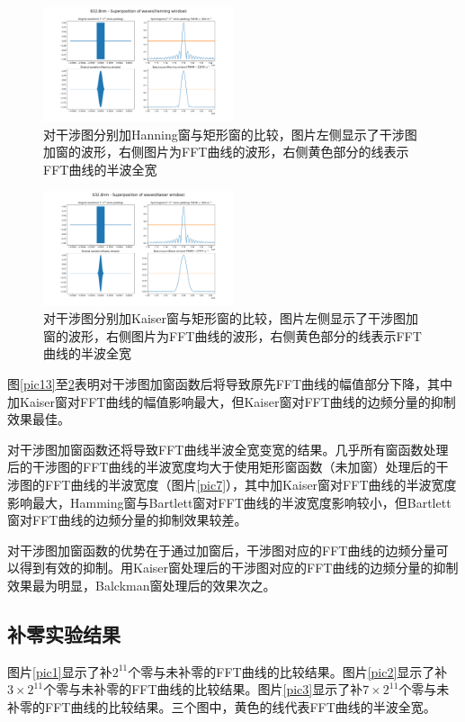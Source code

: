 \documentclass[conference]{IEEEtran}
\begin{document}
\begin{figure}[htbp]
    \centerline{\includegraphics[width=0.5\textwidth]{Hanning.png}}
    \caption{对干涉图分别加Hanning窗与矩形窗的比较，图片左侧显示了干涉图加窗的波形，右侧图片为FFT曲线的波形，右侧黄色部分的线表示FFT曲线的半波全宽}
    \label{pic16}
\end{figure}

\begin{figure}[htbp]
    \centerline{\includegraphics[width=0.5\textwidth]{Kaiser.png}}
    \caption{对干涉图分别加Kaiser窗与矩形窗的比较，图片左侧显示了干涉图加窗的波形，右侧图片为FFT曲线的波形，右侧黄色部分的线表示FFT曲线的半波全宽}
    \label{pic17}
\end{figure}

图\ref{pic13}至\ref{pic17}表明对干涉图加窗函数后将导致原先FFT曲线的幅值部分下降，其中加Kaiser窗对FFT曲线的幅值影响最大，但Kaiser窗对FFT曲线的边频分量的抑制效果最佳。

对干涉图加窗函数还将导致FFT曲线半波全宽变宽的结果。几乎所有窗函数处理后的干涉图的FFT曲线的半波宽度均大于使用矩形窗函数（未加窗）处理后的干涉图的FFT曲线的半波宽度（图片\ref{pic7}），其中加Kaiser窗对FFT曲线的半波宽度影响最大，Hamming窗与Bartlett窗对FFT曲线的半波宽度影响较小，但Bartlett窗对FFT曲线的边频分量的抑制效果较差。

对干涉图加窗函数的优势在于通过加窗后，干涉图对应的FFT曲线的边频分量可以得到有效的抑制。用Kaiser窗处理后的干涉图对应的FFT曲线的边频分量的抑制效果最为明显，Balckman窗处理后的效果次之。

\subsection{补零实验结果}
图片\ref{pic1}显示了补$2^{11}$个零与未补零的FFT曲线的比较结果。图片\ref{pic2}显示了补$3\times2^{11}$个零与未补零的FFT曲线的比较结果。图片\ref{pic3}显示了补$7\times2^{11}$个零与未补零的FFT曲线的比较结果。三个图中，黄色的线代表FFT曲线的半波全宽。
\end{document}
